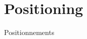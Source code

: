 



\chapter{Positioning}{Positionnements} %

\label{ch:positioning} %


\headercit{}{}{}

\bigskip













